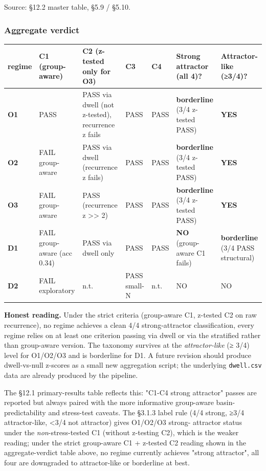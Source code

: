 \documentclass{article}
\theoremstyle{plain}
\theoremstyle{definition}
\begin{document}
Source: §12.2 master table, §5.9 / §5.10.

\subsubsection*{Aggregate verdict}

\begin{table}[h!]
\centering
\small
\begin{tabularx}{\textwidth}{lYYYYYY}
\toprule
regime & C1 (group-aware) & C2 (z-tested only for O3) & C3 & C4 & Strong attractor (all 4)? & Attractor-like (≥3/4)? \\
\midrule
\textbf{O1} & PASS & PASS via dwell (not z-tested), recurrence z fails & PASS & PASS & \textbf{borderline} (3/4 z-tested PASS) & \textbf{YES} \\
\textbf{O2} & FAIL group-aware & PASS via dwell (recurrence z fails) & PASS & PASS & \textbf{borderline} (3/4 z-tested PASS) & \textbf{YES} \\
\textbf{O3} & FAIL group-aware & PASS (recurrence z >> 2) & PASS & PASS & \textbf{borderline} (3/4 z-tested PASS) & \textbf{YES} \\
\textbf{D1} & FAIL group-aware (acc 0.34) & PASS via dwell only & PASS & PASS & \textbf{NO} (group-aware C1 fails) & \textbf{borderline} (3/4 PASS structural) \\
\textbf{D2} & FAIL exploratory & n.t. & PASS small-N & n.t. & NO & NO \\
\bottomrule
\end{tabularx}
\end{table}

\textbf{Honest reading.} Under the strict criteria (group-aware C1,
z-tested C2 on raw recurrence), no regime achieves a clean 4/4
strong-attractor classification, every regime relies on at least
one criterion passing via dwell or via the stratified rather than
group-aware version. The taxonomy survives at the \textit{attractor-like}
(≥ 3/4) level for O1/O2/O3 and is borderline for D1. A future
revision should produce dwell-vs-null z-scores as a small new
aggregation script; the underlying \texttt{dwell.csv} data are already
produced by the pipeline.

The §12.1 primary-results table reflects this: "C1-C4 strong
attractor" passes are reported but always paired with the more
informative group-aware basin-predictability and stress-test
caveats. The §3.1.3 label rule (4/4 strong, ≥3/4
attractor-like, <3/4 not attractor) gives O1/O2/O3 strong-
attractor status under the \textit{non}-stress-tested C1 (without z-testing C2), which is the weaker reading; under the strict group-aware C1 + z-tested C2 reading shown in the aggregate-verdict table above, no regime currently achieves "strong attractor", all four are downgraded to attractor-like or borderline at best.
\end{document}

